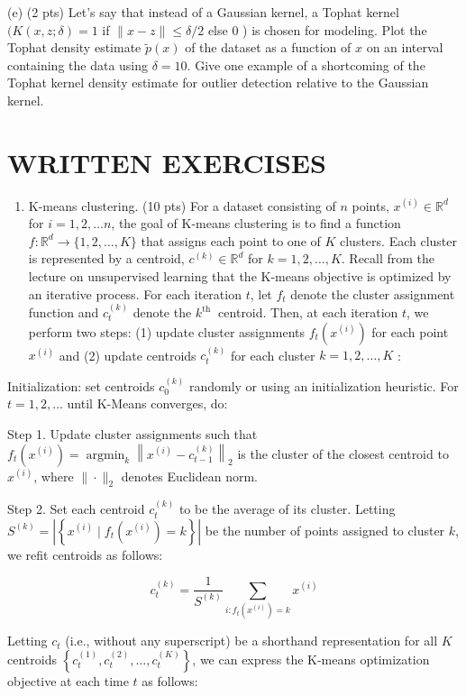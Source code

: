 \documentclass[10pt]{article}
\begin{document}
(e) (2 pts) Let's say that instead of a Gaussian kernel, a Tophat kernel $(K(x, z ; \delta)=1$ if $\|x-z\| \leq \delta / 2$ else 0 ) is chosen for modeling. Plot the Tophat density estimate $\tilde{p}(x)$ of the dataset as a function of $x$ on an interval containing the data using $\delta=10$. Give one example of a shortcoming of the Tophat kernel density estimate for outlier detection relative to the Gaussian kernel.

\section{WRITTEN EXERCISES}
\begin{enumerate}
  \item K-means clustering. (10 pts) For a dataset consisting of $n$ points, $x^{(i)} \in \mathbb{R}^{d}$ for $i=1,2, \ldots n$, the goal of K-means clustering is to find a function $f: \mathbb{R}^{d} \rightarrow\{1,2, \ldots, K\}$ that assigns each point to one of $K$ clusters. Each cluster is represented by a centroid, $c^{(k)} \in \mathbb{R}^{d}$ for $k=1,2, \ldots, K$. Recall from the lecture on unsupervised learning that the K-means objective is optimized by an iterative process. For each iteration $t$, let $f_{t}$ denote the cluster assignment function and $c_{t}^{(k)}$ denote the $k^{\text {th }}$ centroid. Then, at each iteration $t$, we perform two steps: (1) update cluster assignments $f_{t}\left(x^{(i)}\right)$ for each point $x^{(i)}$ and (2) update centroids $c_{t}^{(k)}$ for each cluster $k=1,2, \ldots, K$ :
\end{enumerate}

Initialization: set centroids $c_{0}^{(k)}$ randomly or using an initialization heuristic. For $t=1,2, \ldots$ until K-Means converges, do:

Step 1. Update cluster assignments such that $f_{t}\left(x^{(i)}\right)=\operatorname{argmin}_{k}\left\|x^{(i)}-c_{t-1}^{(k)}\right\|_{2}$ is the cluster of the closest centroid to $x^{(i)}$, where $\|\cdot\|_{2}$ denotes Euclidean norm.

Step 2. Set each centroid $c_{t}^{(k)}$ to be the average of its cluster. Letting $S^{(k)}=\left|\left\{x^{(i)} \mid f_{t}\left(x^{(i)}\right)=k\right\}\right|$ be the number of points assigned to cluster $k$, we refit centroids as follows:

$$
c_{t}^{(k)}=\frac{1}{S^{(k)}} \sum_{i: f_{t}\left(x^{(i)}\right)=k} x^{(i)}
$$

Letting $c_{t}$ (i.e., without any superscript) be a shorthand representation for all $K$ centroids $\left\{c_{t}^{(1)}, c_{t}^{(2)}, \ldots, c_{t}^{(K)}\right\}$, we can express the K-means optimization objective at each time $t$ as follows:
\end{document}
